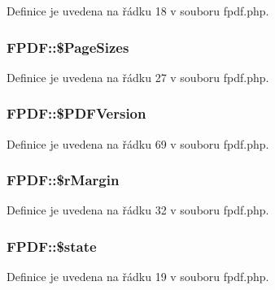 Definice je uvedena na řádku 18 v souboru fpdf.\-php.

\hypertarget{class_f_p_d_f_ad5c52368f21457ca93d7f557a1cf5705}{
\subsubsection[{\$\-Page\-Sizes}]{\setlength{\rightskip}{0pt plus 5cm}F\-P\-D\-F\-::\$\-Page\-Sizes}}\label{class_f_p_d_f_ad5c52368f21457ca93d7f557a1cf5705}


Definice je uvedena na řádku 27 v souboru fpdf.\-php.

\hypertarget{class_f_p_d_f_a5d794ad25d8bbf69f42452deb7e1a2be}{
\subsubsection[{\$\-P\-D\-F\-Version}]{\setlength{\rightskip}{0pt plus 5cm}F\-P\-D\-F\-::\$\-P\-D\-F\-Version}}\label{class_f_p_d_f_a5d794ad25d8bbf69f42452deb7e1a2be}


Definice je uvedena na řádku 69 v souboru fpdf.\-php.

\hypertarget{class_f_p_d_f_a380553db1fe34ac31eab846ec98a366a}{
\subsubsection[{\$r\-Margin}]{\setlength{\rightskip}{0pt plus 5cm}F\-P\-D\-F\-::\$r\-Margin}}\label{class_f_p_d_f_a380553db1fe34ac31eab846ec98a366a}


Definice je uvedena na řádku 32 v souboru fpdf.\-php.

\hypertarget{class_f_p_d_f_a8aef065fb2791fd919608521a801b7d3}{
\subsubsection[{\$state}]{\setlength{\rightskip}{0pt plus 5cm}F\-P\-D\-F\-::\$state}}\label{class_f_p_d_f_a8aef065fb2791fd919608521a801b7d3}


Definice je uvedena na řádku 19 v souboru fpdf.\-php.

